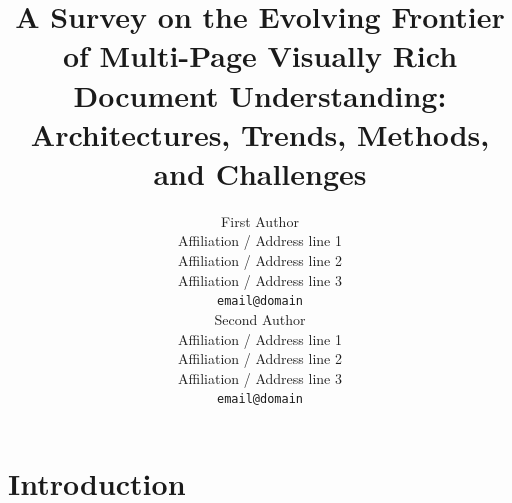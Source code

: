 \documentclass[11pt]{article}
\title{A Survey on the Evolving Frontier of Multi-Page Visually Rich Document Understanding: Architectures, Trends, Methods, and Challenges}
\author{First Author \\
  Affiliation / Address line 1 \\
  Affiliation / Address line 2 \\
  Affiliation / Address line 3 \\
  \texttt{email@domain} \\\And
  Second Author \\
  Affiliation / Address line 1 \\
  Affiliation / Address line 2 \\
  Affiliation / Address line 3 \\
  \texttt{email@domain} \\}
\begin{document}
\maketitle
\begin{abstract}
\end{abstract}

\section{Introduction}

\end{document}
